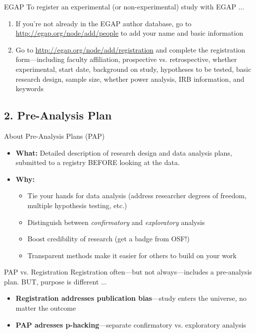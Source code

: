 \documentclass[12pt, compress]{beamer} %
\let\noteitem\item %
\renewcommand{\item}{ 
	\noteitem\vspace{\fill}
	}
\begin{document}
	\begin{frame}{EGAP}
		To register an experimental (or non-experimental) study with EGAP ... 
		
		\begin{enumerate}
			\item If you're not already in the EGAP author database, go to \url{http://egap.org/node/add/people} to add your name and basic information 
			\item Go to \url{http://egap.org/node/add/registration} and complete the registration form---including faculty affiliation, prospective vs. retrospective, whether experimental, start date, background on study, hypotheses to be tested, basic research design, sample size, whether power analysis, IRB information, and keywords
		\end{enumerate}
	\end{frame}	

	
\subsection{2. Pre-Analysis Plan}

	\begin{frame}{About Pre-Analysis Plans (PAP)}
		\begin{itemize}
			\item \textbf{What:} Detailed description of research design and data analysis plans, submitted to a registry BEFORE looking at the data.
			\item \textbf{Why:} 
				\begin{itemize}
				 	\item Tie your hands for data analysis (address researcher degrees of freedom, multiple hypothesis testing, etc.)
				 	\item Distinguish between \textit{confirmatory} and \textit{exploratory} analysis
				 	\item Boost credibility of research (get a badge from OSF!)
				 	\item Transparent methods make it easier for others to build on your work
				\end{itemize}
		\end{itemize}
	\end{frame}
	
	\begin{frame}{PAP vs. Registration}
		Registration often---but not always---includes a pre-analysis plan. BUT, purpose is different ...
		
		\begin{itemize}
			\item \textbf{Registration addresses publication bias}---study enters the universe, no matter the outcome 
			\item \textbf{PAP adresses p-hacking}---separate confirmatory vs. exploratory analysis
		\end{itemize}	
		\bigskip
	\end{frame}
\end{document}
